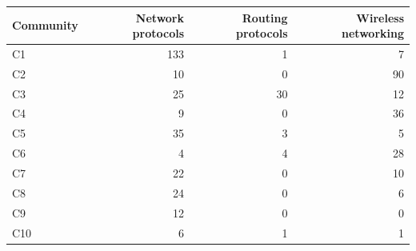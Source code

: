 
\begin{tabular}{lrrr}
\toprule
Community & Network protocols & Routing protocols & Wireless networking\\
\midrule
C1 & 133 & 1 & 7\\
C2 & 10 & 0 & 90\\
C3 & 25 & 30 & 12\\
C4 & 9 & 0 & 36\\
C5 & 35 & 3 & 5\\
C6 & 4 & 4 & 28\\
C7 & 22 & 0 & 10\\
C8 & 24 & 0 & 6\\
C9 & 12 & 0 & 0\\
C10 & 6 & 1 & 1\\
\bottomrule
\end{tabular}
